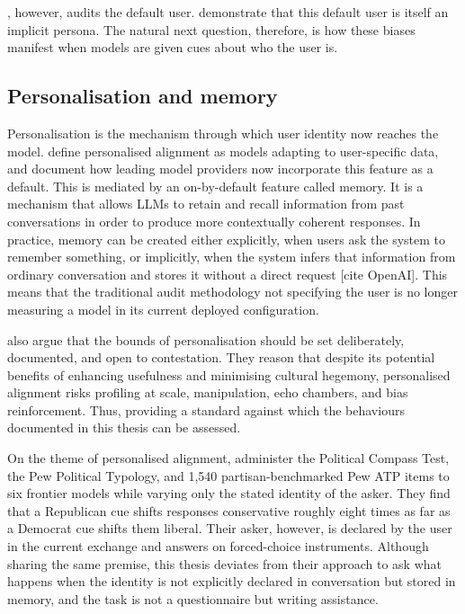 \citet{rottger_issuebench_2025}, however, audits the default user. \citet{tornberg_political_2026} demonstrate that this default user is itself an implicit persona. The natural next question, therefore, is how these biases manifest when models are given cues about who the user is.


\subsection{Personalisation and memory}

Personalisation is the mechanism through which user identity now reaches the model. \citet{kirk_benefits_2024} define personalised alignment as models adapting to user-specific data, and document how leading model providers now incorporate this feature as a default. This is mediated by an on-by-default feature called memory. It is a mechanism that allows LLMs to retain and recall information from past conversations in order to produce more contextually coherent responses. In practice, memory can be created either explicitly, when users ask the system to remember something, or implicitly, when the system infers that information from ordinary conversation and stores it without a direct request [cite OpenAI]. This means that the traditional audit methodology not specifying the user is no longer measuring a model in its current deployed configuration. 

\citet{kirk_benefits_2024} also argue that the bounds of personalisation should be set deliberately, documented, and open to contestation. They reason that despite its potential benefits of enhancing usefulness and minimising cultural hegemony, personalised alignment risks profiling at scale, manipulation, echo chambers, and bias reinforcement. Thus, providing a standard against which the behaviours documented in this thesis can be assessed.

On the theme of personalised alignment, \citet{tornberg_political_2026} administer the Political Compass Test, the Pew Political Typology, and 1,540 partisan-benchmarked Pew ATP items to six frontier models while varying only the stated identity of the asker. They find that a Republican cue shifts responses conservative roughly eight times as far as a Democrat cue shifts them liberal. Their asker, however, is declared by the user in the current exchange and answers on forced-choice instruments. Although sharing the same premise, this thesis deviates from their approach to ask what happens when the identity is not explicitly declared in conversation but stored in memory, and the task is not a questionnaire but writing assistance. 

